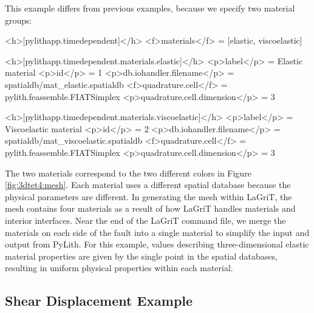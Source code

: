 This example differs from previous examples, because we specify two
material groups:
\begin{cfg}
<h>[pylithapp.timedependent]</h>
<f>materials</f> = [elastic, viscoelastic]

<h>[pylithapp.timedependent.materials.elastic]</h>
<p>label</p> = Elastic material
<p>id</p> = 1
<p>db.iohandler.filename</p> = spatialdb/mat_elastic.spatialdb
<f>quadrature.cell</f> = pylith.feassemble.FIATSimplex
<p>quadrature.cell.dimension</p> = 3

<h>[pylithapp.timedependent.materials.viscoelastic]</h>
<p>label</p> = Viscoelastic material
<p>id</p> = 2
<p>db.iohandler.filename</p> = spatialdb/mat_viscoelastic.spatialdb
<f>quadrature.cell</f> = pylith.feassemble.FIATSimplex
<p>quadrature.cell.dimension</p> = 3
\end{cfg}
The two materials correspond to the two different colors in Figure
\vref{fig:3dtet4:mesh}. Each material uses a different spatial database
because the physical parameters are different. In generating the mesh
within LaGriT, the mesh contains four materials as a result of how
LaGriT handles materials and interior interfaces. Near the end of
the LaGriT command file, we merge the materials on each side of the
fault into a single material to simplify the input and output from
PyLith. For this example, values describing three-dimensional elastic
material properties are given by the single point in the spatial databases,
resulting in uniform physical properties within each material.


\subsection{Shear Displacement Example}

